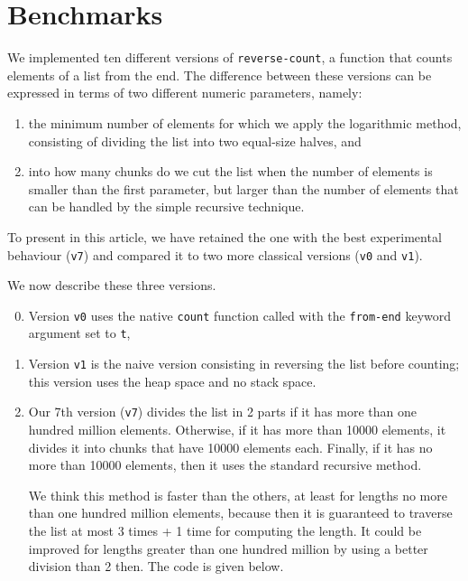 \section{Benchmarks}
\label{sec-benchmarks}

We implemented ten different versions of \texttt{reverse-count}, a
function that counts elements of a list from the end.  The difference
between these versions can be expressed in terms of two different
numeric parameters, namely:

\begin{enumerate}
\item the minimum number of elements for which we apply the
  logarithmic method, consisting of dividing the list into two
  equal-size halves, and
\item into how many chunks do we cut the list when the number of
  elements is smaller than the first parameter, but larger than the
  number of elements that can be handled by the simple recursive
  technique.
\end{enumerate}

To present in this article, 
we have retained the one with the best experimental behaviour (\texttt{v7})
and compared it to two more classical versions  (\texttt{v0} and \texttt{v1}).

We now describe these three versions.

\begin{enumerate}
\setcounter{enumi}{-1}
\item Version \texttt{v0} uses the native \texttt{count} function called with the \texttt{from-end} keyword argument set to \texttt{t},
\item Version \texttt{v1} is the naive version consisting in reversing the list 
before counting; this version uses the heap space and no stack space.
\setcounter{enumi}{6}
\item Our 7th version (\texttt{v7}) divides the list in 2 parts 
if it has more than one 
hundred million elements.  Otherwise, if it has more than 10000
elements, it divides it into chunks that have 10000 elements each.
Finally, if it has no more than 10000 elements, then it uses the
standard recursive method.

We think this method is faster than the others, at least for
lengths no more than one hundred million elements, because then it
is guaranteed to traverse the list at most 3 times + 1 time for
computing the length.  It could be improved for lengths greater
than one hundred million by using a better division than 2 then.
The code is given below.
\end{enumerate}

